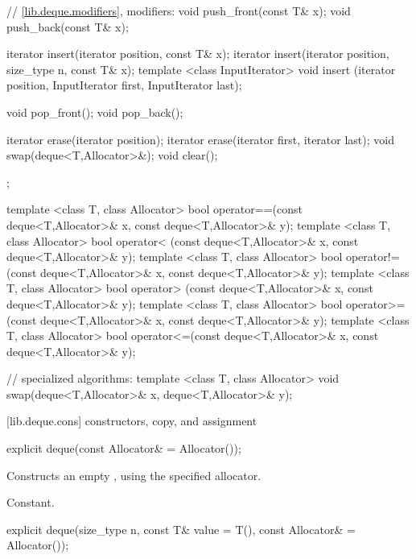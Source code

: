 \begin{codeblock}
{{    // \ref{lib.deque.modifiers}, modifiers:
    void push_front(const T& x);
    void push_back(const T& x);

    iterator insert(iterator position, const T& x);
    iterator insert(iterator position, size_type n, const T& x);
    template <class InputIterator>
      void insert (iterator position,
                   InputIterator first, InputIterator last);

    void pop_front();
    void pop_back();

    iterator erase(iterator position);
    iterator erase(iterator first, iterator last);
    void     swap(deque<T,Allocator>&);
    void     clear();
  };

  template <class T, class Allocator>
    bool operator==(const deque<T,Allocator>& x,
                    const deque<T,Allocator>& y);
  template <class T, class Allocator>
    bool operator< (const deque<T,Allocator>& x,
                    const deque<T,Allocator>& y);
  template <class T, class Allocator>
    bool operator!=(const deque<T,Allocator>& x,
                    const deque<T,Allocator>& y);
  template <class T, class Allocator>
    bool operator> (const deque<T,Allocator>& x,
                    const deque<T,Allocator>& y);
  template <class T, class Allocator>
    bool operator>=(const deque<T,Allocator>& x,
                    const deque<T,Allocator>& y);
  template <class T, class Allocator>
    bool operator<=(const deque<T,Allocator>& x,
                    const deque<T,Allocator>& y);

  // specialized algorithms:
  template <class T, class Allocator>
    void swap(deque<T,Allocator>& x, deque<T,Allocator>& y);
}
\end{codeblock}

[lib.deque.cons]{ constructors, copy, and assignment}

%
%
\begin{itemdecl}
explicit deque(const Allocator& = Allocator());
\end{itemdecl}

\begin{itemdescr}
\pnum
\effects
Constructs an empty
,
using the specified allocator.

\pnum
\complexity
Constant.
\end{itemdescr}

%
%
\begin{itemdecl}
explicit deque(size_type n, const T& value = T(),
               const Allocator& = Allocator());
\end{itemdecl}

